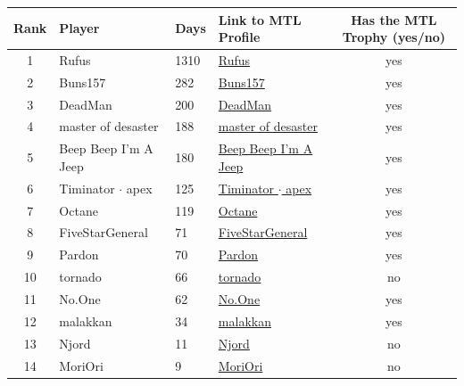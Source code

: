 \begin{table}[ht]
\centering
\begin{tabular}{|c|l|l|l|c|}
\hline
\rowcolor{Baby_Blue}
Rank & Player & Days & Link to MTL Profile & Has the MTL Trophy (yes/no) \\ \hline 
\rowcolor{Light_Blue}
1 & Rufus & 1310 & \href{https://www.warlight-mtl.com/player?playerId=2979814301}{Rufus} & yes\\ \hline
\rowcolor{Light_Blue}
2 & Buns157 & 282 & \href{https://www.warlight-mtl.com/player?playerId=8039234532}{Buns157} & yes \\ \hline
\rowcolor{Light_Blue}
3 & DeadMan & 200 & \href{https://www.warlight-mtl.com/player?playerId=2428496679}{DeadMan} & yes \\ \hline
\rowcolor{Light_Blue}
4 & master of desaster & 188 & \href{https://www.warlight-mtl.com/player?playerId=2214950915}{master of desaster}  & yes \\ \hline
\rowcolor{Light_Blue}
5 & Beep Beep I'm A Jeep & 180 & \href{https://www.warlight-mtl.com/player?playerId=6561482549}{Beep Beep I'm A Jeep}  & yes \\ \hline
\rowcolor{Light_Blue}
6 & Timinator $\cdot$ apex & 125 & \href{https://www.warlight-mtl.com/player?playerId=816809922}{Timinator $\cdot$ apex}  & yes \\ \hline
\rowcolor{Light_Blue}
7 & Octane & 119 & \href{https://www.warlight-mtl.com/player?playerId=3062174051}{Octane} & yes \\ 
\hline
\rowcolor{Light_Blue}
8 & FiveStarGeneral & 71 & \href{https://www.warlight-mtl.com/player?playerId=3388515225}{FiveStarGeneral}  & yes \\ \hline
\rowcolor{Light_Blue}
9 & Pardon & 70 & \href{https://www.warlight-mtl.com/player?playerId=2271461721}{Pardon} & yes \\ \hline
10  & tornado  & 66  & \href{https://www.warlight-mtl.com/player?playerId=3678797622}{tornado} & no \\ \hline
\rowcolor{Light_Blue}
11 & No.One & 62 & \href{https://www.warlight-mtl.com/player?playerId=9859154536}{No.One} & yes \\ \hline
\rowcolor{Light_Blue}
12 & malakkan & 34 & \href{https://www.warlight-mtl.com/player?playerId=257509174}{malakkan} & yes \\ \hline
13 & Njord & 11 & \href{https://www.warlight-mtl.com/player?playerId=7139233655}{Njord} & no \\ \hline
14 & MoriOri & 9 & \href{https://www.warlight-mtl.com/player?playerId=2799621248}{MoriOri} & no \\ \hline

\end{tabular}
\end{table}

